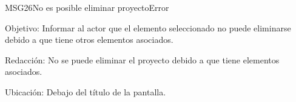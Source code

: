 \begin{mensaje}{MSG26}{No es posible eliminar proyecto}{Error}
	\item [Objetivo:] Informar al actor que el elemento seleccionado no puede eliminarse debido a que tiene otros elementos asociados.
	\item[Redacción:] No se puede eliminar el proyecto debido a que tiene elementos asociados.
	\item [Ubicación:] Debajo del título de la pantalla.
\end{mensaje}